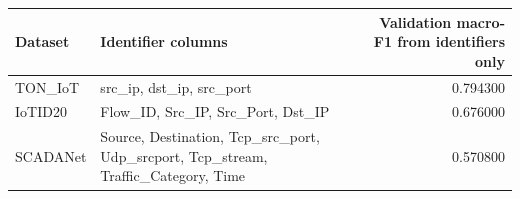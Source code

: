 \begin{tabular}{llr}
\toprule
Dataset & Identifier columns & Validation macro-F1 from identifiers only \\
\midrule
TON\_IoT & src\_ip, dst\_ip, src\_port & 0.794300 \\
IoTID20 & Flow\_ID, Src\_IP, Src\_Port, Dst\_IP & 0.676000 \\
SCADANet & Source, Destination, Tcp\_src\_port, Udp\_srcport, Tcp\_stream, Traffic\_Category, Time & 0.570800 \\
\bottomrule
\end{tabular}

